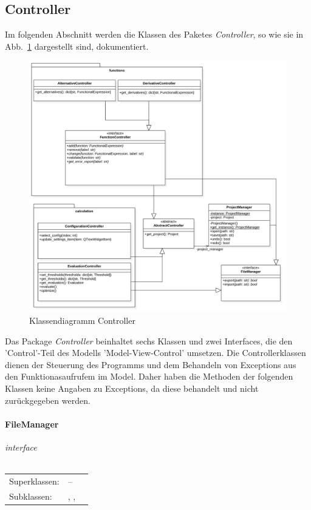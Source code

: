 \documentclass{article}
\newcommand{\classheader}[2][]{\paragraph{#2}
\mbox{}\textit{#1}\\\\}
\newcommand{\classref}[1]{\texttt{\nameref{cls:#1}}}
\begin{document}
\subsection{Controller}

Im folgenden Abschnitt werden die Klassen des Paketes \emph{Controller}, so wie sie in Abb.~\ref{fig:ControllerKlassendiagramm} dargestellt sind, dokumentiert.

\begin{figure}[H]%
    \centering
    \includegraphics[width=13cm]{docs/entwurf/Floriane/ControllerKlassendiagramm.png}
    \caption{Klassendiagramm Controller}
    \label{fig:ControllerKlassendiagramm}
\end{figure}

Das Package \textit{Controller} beinhaltet sechs Klassen und zwei Interfaces, die den 'Control'-Teil des Modells 'Model-View-Control' umsetzen. Die Controllerklassen dienen der Steuerung des Programms und dem Behandeln von Exceptions aus den Funktionasaufrufem im Model. Daher haben die Methoden der folgenden Klassen keine Angaben zu Exceptions, da diese behandelt und nicht zurückgegeben werden.

\newpage
\classheader[\flqq{}interface\frqq]{FileManager}\label{cls:FileManager}
\begin{tabular}{lll}
 Superklassen: & --\\
 Subklassen: & \classref{ProjectManager}, \classref{FunctionController}, \classref{EvaluationController}
\end{tabular}\\
\end{document}

